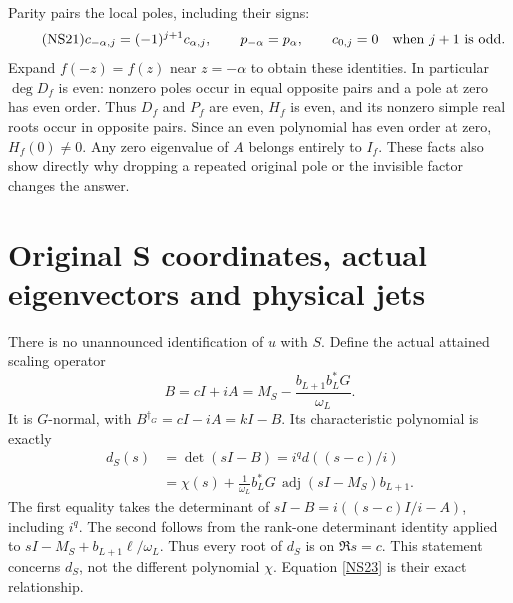 \documentclass[11pt]{article}
\begin{document}
Parity pairs the local poles, including their signs:
\begin{equation}\tag{NS21}\label{NS21}
c_{-\alpha,j}=(-1)^{j+1}c_{\alpha,j},\qquad
p_{-\alpha}=p_\alpha,\qquad
c_{0,j}=0\quad\hbox{when }j+1\hbox{ is odd}.
\end{equation}
Expand $f(-z)=f(z)$ near $z=-\alpha$ to obtain these
identities. In particular $\deg D_f$ is even: nonzero
poles occur in equal opposite pairs and a pole at zero
has even order. Thus $D_f$ and $P_f$ are even, $H_f$
is even, and its nonzero simple real roots occur in
opposite pairs. Since an even polynomial has even
order at zero, $H_f(0)\ne0$. Any zero eigenvalue of
$A$ belongs entirely to $I_f$. These facts also show
directly why dropping a repeated original pole or the
invisible factor changes the answer.

\section{Original S coordinates, actual eigenvectors and physical jets}

There is no unannounced identification of $u$ with $S$.
Define the actual attained scaling operator
\begin{equation}\tag{NS22}\label{NS22}
B=cI+iA=M_S-\frac{b_{L+1}b_L^*G}{\omega_L}.
\end{equation}
It is $G$-normal, with $B^{\dagger_G}=cI-iA=kI-B$.
Its characteristic polynomial is exactly
\begin{equation}\tag{NS23}\label{NS23}
\begin{split}
d_S(s)&=\det(sI-B)=i^qd((s-c)/i)\\
 &=\chi(s)
  +\frac1{\omega_L}b_L^*G\,
               \operatorname{adj}(sI-M_S)b_{L+1}.
\end{split}
\end{equation}
The first equality takes the determinant of
$sI-B=i((s-c)I/i-A)$, including $i^q$.
The second follows from the rank-one determinant identity
applied to $sI-M_S+b_{L+1}\ell/\omega_L$.
Thus every root of $d_S$ is on $\Re s=c$.
This statement concerns $d_S$, not the different polynomial
$\chi$. Equation \eqref{NS23} is their exact relationship.
\end{document}
